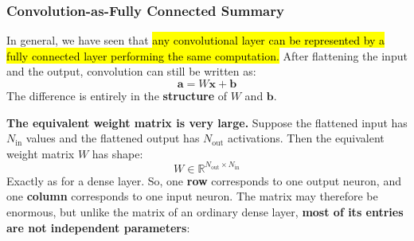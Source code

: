 \subsubsection{Convolution-as-Fully Connected Summary}\label{sec:convolution-as-fully-connected-summary}

In general, we have seen that \hl{any convolutional layer can be represented by a fully connected layer performing the same computation.} After flattening the input and the output, convolution can still be written as:
\begin{equation*}
    \mathbf{a} = W\mathbf{x} + \mathbf{b}
\end{equation*}
The difference is entirely in the \textbf{structure} of $W$ and $\mathbf{b}$.

\highspace
\textcolor{Green3}{ \textbf{The equivalent weight matrix is very large.}} Suppose the flattened input has $N_{\text{in}}$ values and the flattened output has $N_{\text{out}}$ activations. Then the equivalent weight matrix $W$ has shape:
\begin{equation*}
    W \in \mathbb{R}^{N_{\text{out}} \times N_{\text{in}}}
\end{equation*}
Exactly as for a dense layer. So, one \textbf{row} corresponds to one output neuron, and one \textbf{column} corresponds to one input neuron. The matrix may therefore be enormous, but unlike the matrix of an ordinary dense layer, \textbf{most of its entries are not independent parameters}:
